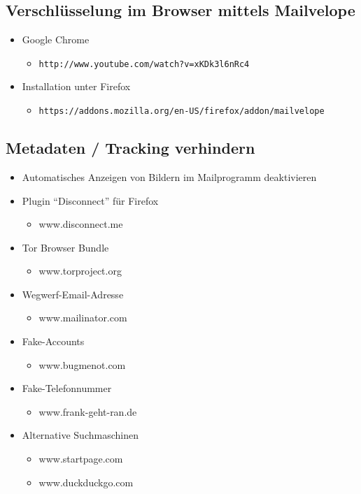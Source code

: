 \documentclass[a5paper]{scrartcl}
\begin{document}
\subsection*{Verschlüsselung im Browser mittels Mailvelope}
\begin{itemize}
   \item Google Chrome
      \begin{itemize}
         \item[] \texttt{http://www.youtube.com/watch?v=xKDk3l6nRc4}
      \end{itemize}
   \item Installation unter Firefox
      \begin{itemize}
         \item[] \footnotesize{\texttt{https://addons.mozilla.org/en-US/firefox/addon/mailvelope}} 
      \end{itemize}
\end{itemize}

\subsection*{Metadaten / Tracking verhindern}
\begin{itemize}
  \item Automatisches Anzeigen von Bildern im Mailprogramm deaktivieren
  \item Plugin ``Disconnect'' für Firefox 
    \begin{itemize}
      \item www.disconnect.me
    \end{itemize}
  \item Tor Browser Bundle 
    \begin{itemize}
      \item www.torproject.org
    \end{itemize}
  \item Wegwerf-Email-Adresse 
    \begin{itemize}
      \item www.mailinator.com
    \end{itemize}
  \item Fake-Accounts
    \begin{itemize}
      \item www.bugmenot.com
    \end{itemize}
  \item Fake-Telefonnummer 
    \begin{itemize}
      \item www.frank-geht-ran.de
    \end{itemize}
  \item Alternative Suchmaschinen 
    \begin{itemize}
      \item www.startpage.com 
      \item www.duckduckgo.com
    \end{itemize}
\end{itemize}
\end{document}
